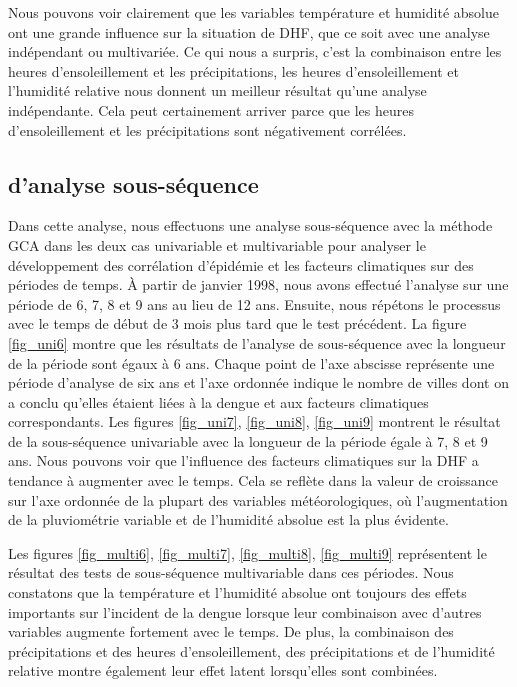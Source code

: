 Nous pouvons voir clairement que les variables température et humidité absolue ont une grande influence sur la situation de DHF, que ce soit avec une analyse indépendant ou multivariée. Ce qui nous a surpris, c'est la combinaison entre les heures d'ensoleillement et les précipitations, les heures d'ensoleillement et l'humidité relative nous donnent un meilleur résultat qu'une analyse indépendante. Cela peut certainement arriver parce que les heures d'ensoleillement et les précipitations sont négativement corrélées.
 
\subsection{\Rs d'analyse sous-séquence}

Dans cette analyse, nous effectuons une analyse sous-séquence  avec la méthode  GCA dans les deux cas univariable et multivariable pour analyser le développement des corrélation  d'épidémie et les facteurs climatiques sur des périodes de temps. À partir de janvier 1998, nous avons effectué l’analyse sur une période de 6, 7, 8 et 9 ans au lieu de 12 ans. Ensuite, nous répétons le processus avec le temps de début de 3 mois plus tard que le test précédent. La figure \ref{fig_uni6} montre que les résultats de l'analyse de sous-séquence avec la longueur de la période sont égaux à 6 ans. Chaque point de l'axe abscisse représente une période d'analyse de six ans et l'axe ordonnée indique le nombre de villes dont on a conclu qu'elles étaient liées à la dengue et aux facteurs climatiques correspondants. Les figures \ref{fig_uni7}, \ref{fig_uni8}, \ref{fig_uni9} montrent le résultat de la sous-séquence univariable avec la longueur de la période égale à 7, 8 et 9 ans. Nous pouvons voir que l'influence des facteurs climatiques sur la DHF a tendance à augmenter avec le temps. Cela se reflète dans la valeur de croissance sur l'axe ordonnée de la plupart des variables météorologiques, où l'augmentation de la pluviométrie variable et de l'humidité absolue est la plus évidente. 

Les figures \ref{fig_multi6}, \ref{fig_multi7}, \ref{fig_multi8}, \ref{fig_multi9} représentent le résultat des tests de sous-séquence multivariable dans ces périodes. Nous constatons que la température et l’humidité absolue ont toujours des effets importants sur l’incident de la dengue lorsque leur combinaison avec d’autres variables augmente fortement avec le temps. De plus, la combinaison des précipitations et des heures d'ensoleillement, des précipitations et de l'humidité relative montre également leur effet latent lorsqu'elles sont combinées.

